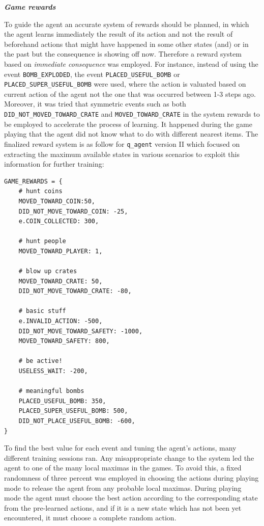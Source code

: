\documentclass{article}
\begin{document}
\textbf{\textit{Game rewards}}


To guide the agent an accurate system of rewards should be planned, in which the agent learns immediately the result of its action and not the result of beforehand actions that might have happened in some other states (and) or in the past but the consequence is showing off now. Therefore a reward system based on \textit{immediate consequence} was employed. For instance, instead of using the event \texttt{BOMB\_EXPLODED}, the event \texttt{PLACED\_USEFUL\_BOMB} or \texttt{PLACED\_SUPER\_USEFUL\_BOMB} were used, where the action is valuated based on current action of the agent not the one that was occurred between 1-3 steps ago. Moreover, it was tried that symmetric events such as both \texttt{DID\_NOT\_MOVED\_TOWARD\_CRATE} and \texttt{MOVED\_TOWARD\_CRATE} in the system rewards to be employed to accelerate the process of learning. It happened during the game playing that the agent did not know what to do with different nearest items. The finalized reward system is as follow for \texttt{q\_agent} version II which focused on extracting the maximum available states in various scenarios to exploit this information for further training:  

\begin{verbatim}
GAME_REWARDS = {
    # hunt coins
    MOVED_TOWARD_COIN:50,
    DID_NOT_MOVE_TOWARD_COIN: -25,
    e.COIN_COLLECTED: 300,

    # hunt people
    MOVED_TOWARD_PLAYER: 1,

    # blow up crates
    MOVED_TOWARD_CRATE: 50,
    DID_NOT_MOVE_TOWARD_CRATE: -80,

    # basic stuff
    e.INVALID_ACTION: -500,
    DID_NOT_MOVE_TOWARD_SAFETY: -1000,
    MOVED_TOWARD_SAFETY: 800,

    # be active!
    USELESS_WAIT: -200,

    # meaningful bombs
    PLACED_USEFUL_BOMB: 350,
    PLACED_SUPER_USEFUL_BOMB: 500,
    DID_NOT_PLACE_USEFUL_BOMB: -600,
}
\end{verbatim}

To find the best value for each event and tuning the agent's actions, many different training sessions ran. Any misappropriate change to the system led the agent to one of the many local maximas in the games. To avoid this, a fixed randomness of three percent was employed in choosing the actions during playing mode to release the agent from any probable local maximas. During playing mode the agent must choose the best action according to the corresponding state from the pre-learned actions, and if it is a new state which has not been yet encountered, it must choose a complete random action.
\end{document}
